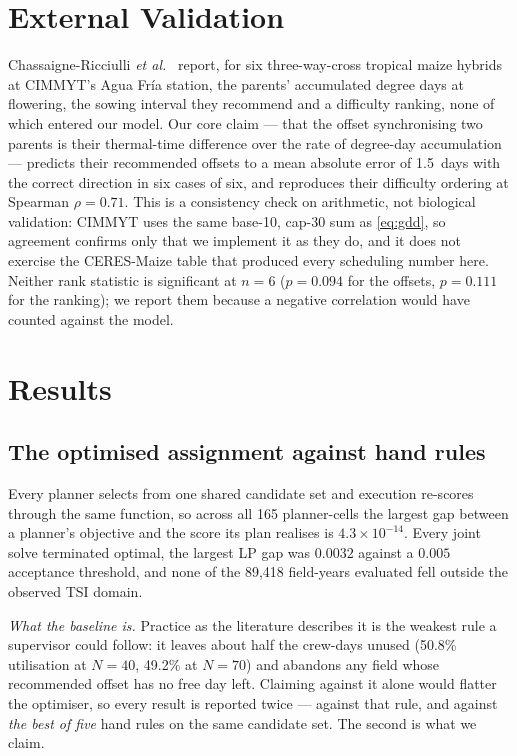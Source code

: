 \documentclass[10pt,twocolumn]{article}
\begin{document}
\section{External Validation}
\label{sec:validation}

Chassaigne-Ricciulli \textit{et al.}~\cite{chassaigne2021} report, for six
three-way-cross tropical maize hybrids at CIMMYT's Agua Fr\'ia station, the
parents' accumulated degree days at flowering, the sowing interval they
recommend and a difficulty ranking, none of which entered our model. Our
core claim --- that the offset synchronising two parents is their
thermal-time difference over the rate of degree-day accumulation ---
predicts their recommended offsets to a mean absolute error of 1.5~days with
the correct direction in six cases of six, and reproduces their difficulty
ordering at Spearman $\rho = 0.71$. This is a consistency check on
arithmetic, not biological validation: CIMMYT uses the same base-10, cap-30
sum as \eqref{eq:gdd}, so agreement confirms only that we implement it as
they do, and it does not exercise the CERES-Maize table that produced every
scheduling number here. Neither rank statistic is significant at $n = 6$
($p = 0.094$ for the offsets, $p = 0.111$ for the ranking); we report them
because a negative correlation would have counted against the model.

\section{Results}
\label{sec:results}

\subsection{The optimised assignment against hand rules}

Every planner selects from one shared candidate set and execution re-scores
through the same function, so across all 165 planner-cells the largest gap
between a planner's objective and the score its plan realises is
$4.3 \times 10^{-14}$. Every joint solve terminated optimal, the largest LP
gap was $0.0032$ against a $0.005$ acceptance threshold, and none of the
89{,}418 field-years evaluated fell outside the observed TSI domain.

\emph{What the baseline is.} Practice as the literature describes it is the
weakest rule a supervisor could follow: it leaves about half the crew-days
unused (50.8\% utilisation at $N = 40$, 49.2\% at $N = 70$) and abandons any
field whose recommended offset has no free day left. Claiming against it
alone would flatter the optimiser, so every result is reported twice ---
against that rule, and against \emph{the best of five} hand rules on the
same candidate set. The second is what we claim.
\end{document}

